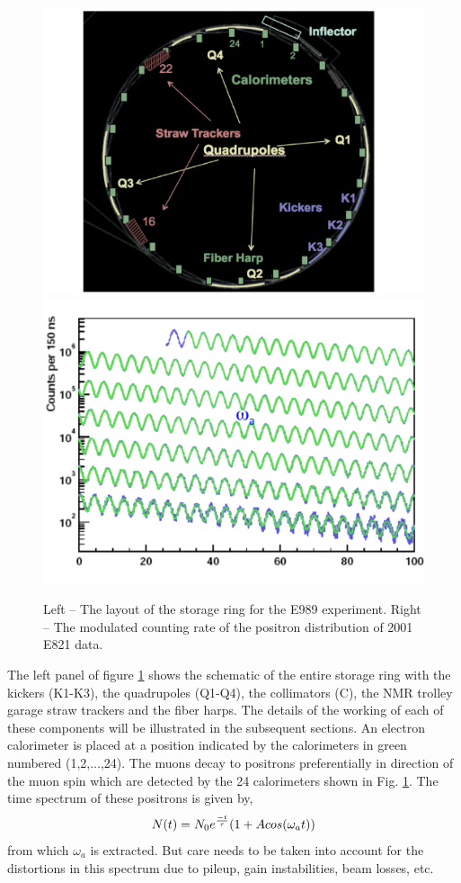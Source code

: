 \documentclass[journal,article,submit,moreauthors,pdftex,10pt,a4paper]{Definitions/mdpi}
\begin{document}
\begin{figure}[H]
\centering
\includegraphics[width=7 cm]{ring.pdf}
\includegraphics[width=7 cm]{wiggle_bnl.pdf}
\caption{\label{fig3}Left -- The layout of the storage ring for the E989 experiment. 
Right -- The modulated counting rate of the positron distribution of 2001 E821 data.}
\end{figure} 
The left panel of figure \ref{fig3} shows the schematic of the entire storage ring with the
kickers (K1-K3), the quadrupoles (Q1-Q4), the collimators (C), the
NMR trolley garage straw trackers and the fiber harps. The details of the 
working of each of these components will be illustrated 
in the subsequent sections. An electron calorimeter is placed at
a position indicated by the calorimeters in green numbered (1,2,...,24).
The muons decay to positrons preferentially in direction of the muon spin
which are detected by the 24 calorimeters shown in Fig. \ref{fig3}. The time spectrum
of these positrons is given by,
\begin{equation}{\label{no_muon}}
N(t) = N_0 e^{\frac{-t}{\tau}} (1 + A cos(\omega_at)) 
\end{equation}
from which $\omega_a$ is extracted. But care needs to be taken into account for the
distortions in this spectrum due to pileup, gain instabilities, beam losses, etc.

\end{document}
